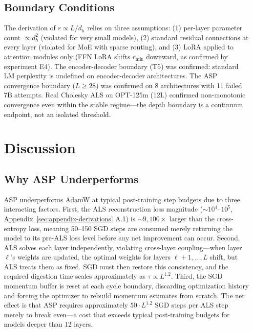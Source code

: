 \documentclass[11pt]{article}
\begin{document}
\subsection{Boundary Conditions}

The derivation of $r \propto L/d_h$ relies on three assumptions: (1) per-layer parameter count $\propto d_h^2$ (violated for very small models), (2) standard residual connections at every layer (violated for MoE with sparse routing), and (3) LoRA applied to attention modules only (FFN LoRA shifts $r_{\min}$ downward, as confirmed by experiment E4). The encoder-decoder boundary (T5) was confirmed: standard LM perplexity is undefined on encoder-decoder architectures. The ASP convergence boundary ($L \geq 28$) was confirmed on 8 architectures with 11 failed 7B attempts. Real Cholesky ALS on OPT-125m (12L) confirmed non-monotonic convergence even within the stable regime---the depth boundary is a continuum endpoint, not an isolated threshold.

\section{Discussion}

\subsection{Why ASP Underperforms}

ASP underperforms AdamW at typical post-training step budgets due to three interacting factors. First, the ALS reconstruction loss magnitude ($\sim 10^4$--$10^5$, Appendix~\ref{sec:appendix-derivations} A.1) is $\sim 9,100\times$ larger than the cross-entropy loss, meaning 50--150 SGD steps are consumed merely returning the model to its pre-ALS loss level before any net improvement can occur. Second, ALS solves each layer independently, violating cross-layer coupling---when layer $\ell$'s weights are updated, the optimal weights for layers $\ell+1, \ldots, L$ shift, but ALS treats them as fixed. SGD must then restore this consistency, and the required digestion time scales approximately as $\tau \propto L^{1.2}$. Third, the SGD momentum buffer is reset at each cycle boundary, discarding optimization history and forcing the optimizer to rebuild momentum estimates from scratch. The net effect is that ASP requires approximately $50 \cdot L^{1.2}$ SGD steps per ALS step merely to break even---a cost that exceeds typical post-training budgets for models deeper than 12 layers.
\end{document}
